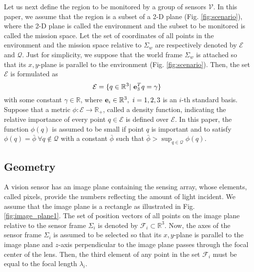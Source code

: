 \documentclass[conference,letterpaper]{ieeeconf}
\newcommand{\V}{{\mathcal V}}
\newcommand{\E}{{\mathcal E}}
\newcommand{\Q}{{\mathcal Q}}
\newcommand{\R}{{\mathbb R}}
\begin{document}
Let us next define the region to be monitored by a group of sensors $\V$.
In this paper, we assume that 
the region is a subset of a 2-D plane (Fig. \ref{fig:scenario}), where the 
2-D plane is called the environment and the subset to be monitored
is called the mission space.
Let the set of coordinates of all points in the environment and the mission space 
relative to $\Sigma_w$ are respectively 
denoted by $\E$ and $\Q$.
Just for simplicity, we suppose that 
the world frame $\Sigma_w$ is attached so that its
$x,y$-plane is parallel to the environment
(Fig. \ref{fig:scenario}).
Then, the set $\E$ is formulated as 
\[
\E = \{q \in \R^3|\ {\bf e}_3^Tq = \gamma\}
\]
with some constant $\gamma \in \R$,
where ${\bf e}_i \in \R^3,\ i=1,2,3$ is an $i$-th standard basis.
Suppose that a metric $\phi: \E \to \R_+$,
called a density function, indicating the relative importance of 
every point $q\in \E$ is defined over $\E$.
In this paper, the function $\phi(q)$ is assumed to be small if point $q$ is important
and to satisfy $\phi(q) = \bar{\phi} \ {\forall q} \notin \Q$ with a constant
$\bar{\phi}$ such that $\bar{\phi} > \sup_{q\in \Q}\phi(q)$.





\subsection{Geometry}






A vision sensor has an image plane containing the sensing array, 
whose elements, called pixels, 
provide the numbers reflecting 
the amount of light incident.
We assume that the image plane is a rectangle as illustrated in Fig. \ref{fig:image_plane1}.
The set of position vectors of all points on the image plane relative to the sensor frame $\Sigma_i$
is denoted by ${\mathcal F}_i \subset \R^3$. 
Now, the axes of the sensor frame $\Sigma_i$ is assumed to be selected 
so that its $x,y$-plane is parallel to the image plane
and $z$-axis perpendicular to the image plane passes through 
the focal center of the lens.
Then, the third element of any point in the set ${\mathcal F}_i$ 
must be equal to the focal length
$\lambda_i$.
\end{document}
